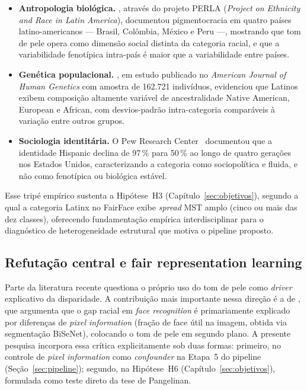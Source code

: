 \begin{itemize}
\item \textbf{Antropologia biológica.} \textcite{telles2014pigmentocrac}, através do projeto PERLA (\emph{Project on Ethnicity and Race in Latin America}), documentou pigmentocracia em quatro países latino-americanos --- Brasil, Colômbia, México e Peru ---, mostrando que tom de pele opera como dimensão social distinta da categoria racial, e que a variabilidade fenotípica intra-país é maior que a variabilidade entre países.

\item \textbf{Genética populacional.} \textcite{bryc2015genetic}, em estudo publicado no \emph{American Journal of Human Genetics} com amostra de 162.721 indivíduos, evidenciou que Latinos exibem composição altamente variável de ancestralidade Native American, European e African, com desvios-padrão intra-categoria comparáveis à variação entre outros grupos.

\item \textbf{Sociologia identitária.} O Pew Research Center~\autocite{lopez2017hispanic} documentou que a identidade Hispanic declina de 97\,\% para 50\,\% ao longo de quatro gerações nos Estados Unidos, caracterizando a categoria como sociopolítica e fluida, e não como fenotípica ou biológica estável.
\end{itemize}

Esse tripé empírico sustenta a Hipótese~H3 (Capítulo~\ref{sec:objetivos}), segundo a qual a categoria Latinx no FairFace exibe \emph{spread} MST amplo (cinco ou mais das dez classes), oferecendo fundamentação empírica interdisciplinar para o diagnóstico de heterogeneidade estrutural que motiva o pipeline proposto.

\subsection{Refutação central e fair representation learning}
\label{sec:rl_fairrep}

Parte da literatura recente questiona o próprio uso do tom de pele como \emph{driver} explicativo da disparidade. A contribuição mais importante nessa direção é a de \textcite{pangelinan2023exploring}, que argumenta que o gap racial em \emph{face recognition} é primariamente explicado por diferenças de \emph{pixel information} (fração de face útil na imagem, obtida via segmentação BiSeNet), colocando o tom de pele em segundo plano. A presente pesquisa incorpora essa crítica explicitamente sob duas formas: primeiro, no controle de \emph{pixel information} como \emph{confounder} na Etapa~5 do pipeline (Seção~\ref{sec:pipeline}); segundo, na Hipótese~H6 (Capítulo~\ref{sec:objetivos}), formulada como teste direto da tese de Pangelinan.

